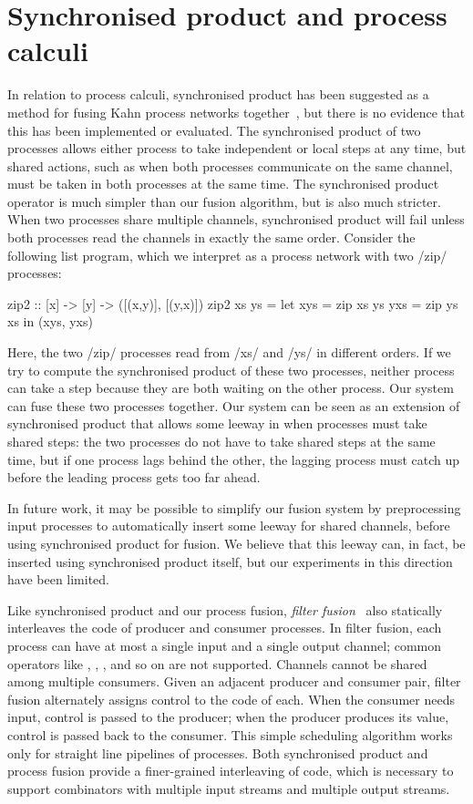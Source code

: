 \section{Synchronised product and process calculi}
\label{related/synchronised-product}

In relation to process calculi, synchronised product has been suggested as a method for fusing Kahn process networks together~\cite{fradet2004network}, but there is no evidence that this has been implemented or evaluated.
The synchronised product of two processes allows either process to take independent or local steps at any time, but shared actions, such as when both processes communicate on the same channel, must be taken in both processes at the same time.
The synchronised product operator is much simpler than our fusion algorithm, but is also much stricter.
When two processes share multiple channels, synchronised product will fail unless both processes read the channels in exactly the same order.
Consider the following list program, which we interpret as a process network with two \Hs/zip/ processes:
\begin{haskell}
zip2 :: [x] -> [y] -> ([(x,y)], [(y,x)])
zip2 xs ys =
 let xys = zip xs ys
     yxs = zip ys xs
 in (xys, yxs)
\end{haskell}

Here, the two \Hs/zip/ processes read from \Hs/xs/ and \Hs/ys/ in different orders.
If we try to compute the synchronised product of these two processes, neither process can take a step because they are both waiting on the other process.
Our system can fuse these two processes together.
Our system can be seen as an extension of synchronised product that allows some leeway in when processes must take shared steps: the two processes do not have to take shared steps at the same time, but if one process lags behind the other, the lagging process must catch up before the leading process gets too far ahead.

In future work, it may be possible to simplify our fusion system by preprocessing input processes to automatically insert some leeway for shared channels, before using synchronised product for fusion.
We believe that this leeway can, in fact, be inserted using synchronised product itself, but our experiments in this direction have been limited.

Like synchronised product and our process fusion, \emph{filter fusion}~\citep{proebsting1996filter} also statically interleaves the code of producer and consumer processes.
In filter fusion, each process can have at most a single input and a single output channel; common operators like \Hs@zip@, \Hs@unzip@, \Hs@append@, \Hs@partition@ and so on are not supported.
Channels cannot be shared among multiple consumers.
Given an adjacent producer and consumer pair, filter fusion alternately assigns control to the code of each.
When the consumer needs input, control is passed to the producer; when the producer produces its value, control is passed back to the consumer.
This simple scheduling algorithm works only for straight line pipelines of processes.
Both synchronised product and process fusion provide a finer-grained interleaving of code, which is necessary to support combinators with multiple input streams and multiple output streams.

